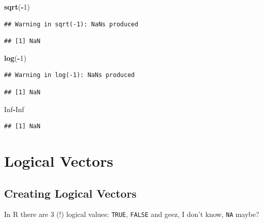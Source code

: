 \documentclass[10pt,b5paper,krantz1]{krantz}
\newenvironment{Shaded}{\begin{snugshade}}{\end{snugshade}}
\newcommand{\DecValTok}[1]{\textcolor[rgb]{0.06,0.06,0.06}{#1}}
\newcommand{\KeywordTok}[1]{\textcolor[rgb]{0.27,0.27,0.27}{\textbf{#1}}}
\newcommand{\NormalTok}[1]{#1}
\newcommand{\OperatorTok}[1]{\textcolor[rgb]{0.43,0.43,0.43}{\textbf{#1}}}
\newcommand{\OtherTok}[1]{\textcolor[rgb]{0.37,0.37,0.37}{#1}}
\begin{document}
\begin{Shaded}
\begin{Highlighting}[]
\KeywordTok{sqrt}\NormalTok{(}\OperatorTok{-}\DecValTok{1}\NormalTok{)}
\end{Highlighting}
\end{Shaded}

\begin{verbatim}
## Warning in sqrt(-1): NaNs produced
\end{verbatim}

\begin{verbatim}
## [1] NaN
\end{verbatim}

\begin{Shaded}
\begin{Highlighting}[]
\KeywordTok{log}\NormalTok{(}\OperatorTok{-}\DecValTok{1}\NormalTok{)}
\end{Highlighting}
\end{Shaded}

\begin{verbatim}
## Warning in log(-1): NaNs produced
\end{verbatim}

\begin{verbatim}
## [1] NaN
\end{verbatim}

\begin{Shaded}
\begin{Highlighting}[]
\OtherTok{Inf}\OperatorTok{-}\OtherTok{Inf}
\end{Highlighting}
\end{Shaded}

\begin{verbatim}
## [1] NaN
\end{verbatim}

\hypertarget{logical-vectors}{%
\section{Logical Vectors}\label{logical-vectors}}

\hypertarget{creating-logical-vectors}{%
\subsection{Creating Logical Vectors}\label{creating-logical-vectors}}

In R there are 3 (!) logical values:
\texttt{TRUE}, \texttt{FALSE} and geez, I don't know, \texttt{NA} maybe?
\end{document}
